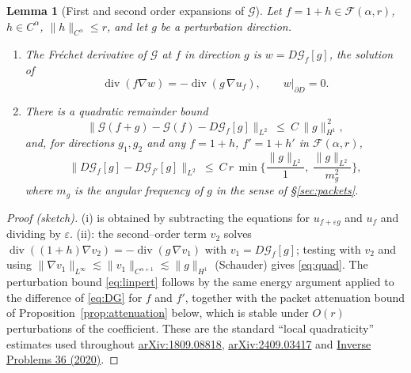\documentclass[11pt]{article}
\newtheorem{lemma}[theorem]{Lemma}
\newcommand{\1}{\mathbf{1}}
\newcommand{\norm}[1]{\lVert #1\rVert}
\newcommand{\Gf}{\mathcal{G}}
\newcommand{\F}{\mathcal{F}}
\DeclareMathOperator{\divg}{div}
\begin{document}
\begin{lemma}[First and second order expansions of $\Gf$]\label{lem:expansion}
Let $f=1+h\in\F(\alpha,r)$, $h\in C^\alpha$, $\norm h_{C^\alpha}\le r$, and let $g$ be a
perturbation direction.
\begin{enumerate}
\item[(i)] The Fr\'echet derivative of $\Gf$ at $f$ in direction $g$ is
$w=D\Gf_f[g]$, the solution of
\begin{equation}\label{eq:DG}
\divg(f\nabla w)=-\divg(g\,\nabla u_f),\qquad w|_{\partial D}=0 .
\end{equation}
\item[(ii)] There is a quadratic remainder bound
\begin{equation}\label{eq:quad}
\norm{\Gf(f+g)-\Gf(f)-D\Gf_f[g]}_{L^2}\ \le\ C\,\norm g_{H^1}^{\,2},
\end{equation}
and, for directions $g_1,g_2$ and any $f=1+h$, $f'=1+h'$ in $\F(\alpha,r)$,
\begin{equation}\label{eq:linpert}
\norm{D\Gf_{f}[g]-D\Gf_{f'}[g]}_{L^2}\ \le\ C\, r\,\min\Big\{\frac{\norm g_{L^2}}{1},\ \frac{\norm g_{L^2}}{m_g^2}\Big\},
\end{equation}
where $m_g$ is the angular frequency of $g$ in the sense of \S\ref{sec:packets}.
\end{enumerate}
\end{lemma}

\begin{proof}[Proof (sketch)]
(i) is obtained by subtracting the equations for $u_{f+\varepsilon g}$ and $u_f$ and
dividing by $\varepsilon$. (ii): the second--order term $v_2$ solves
$\divg((1+h)\nabla v_2)=-\divg(g\,\nabla v_1)$ with $v_1=D\Gf_f[g]$; testing with $v_2$
and using $\norm{\nabla v_1}_{L^\infty}\lesssim\norm{v_1}_{C^{\alpha+1}}\lesssim
\norm g_{H^1}$ (Schauder) gives \eqref{eq:quad}. The perturbation bound
\eqref{eq:linpert} follows by the same energy argument applied to the difference of
\eqref{eq:DG} for $f$ and $f'$, together with the packet attenuation bound of
Proposition~\ref{prop:attenuation} below, which is stable under $O(r)$ perturbations of
the coefficient. These are the standard ``local quadraticity'' estimates used throughout
\href{https://export.arxiv.org/pdf/1809.08818v3.pdf}{arXiv:1809.08818},
\href{https://arxiv.org/html/2409.03417}{arXiv:2409.03417} and
\href{https://google.iopscience.iop.org/article/10.1088/1361-6420/ab7d2a}{Inverse Problems 36 (2020)}.
\end{proof}
\end{document}
